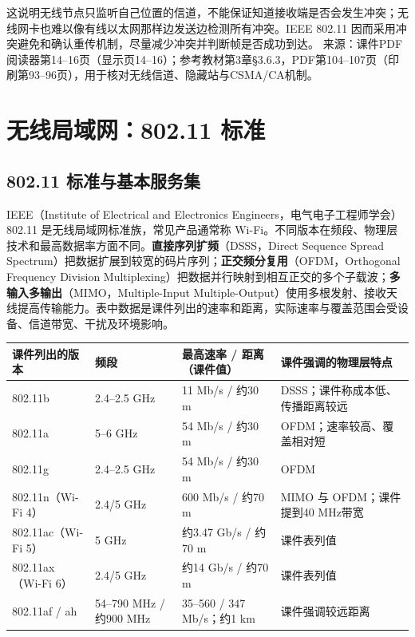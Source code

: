 这说明无线节点只监听自己位置的信道，不能保证知道接收端是否会发生冲突；无线网卡也难以像有线以太网那样边发送边检测所有冲突。IEEE 802.11 因而采用冲突避免和确认重传机制，尽量减少冲突并判断帧是否成功到达。
\annotationarea[4]
\small 来源：课件PDF阅读器第14--16页（显示页14--16）；参考教材第3章§3.6.3，PDF第104--107页（印刷第93--96页），用于核对无线信道、隐藏站与CSMA/CA机制。\normalsize

\section{无线局域网：802.11 标准}
\subsection{802.11 标准与基本服务集}
IEEE（Institute of Electrical and Electronics Engineers，电气电子工程师学会）802.11 是无线局域网标准族，常见产品通常称 Wi-Fi。不同版本在频段、物理层技术和最高数据率方面不同。\textbf{直接序列扩频}（DSSS，Direct Sequence Spread Spectrum）把数据扩展到较宽的码片序列；\textbf{正交频分复用}（OFDM，Orthogonal Frequency Division Multiplexing）把数据并行映射到相互正交的多个子载波；\textbf{多输入多输出}（MIMO，Multiple-Input Multiple-Output）使用多根发射、接收天线提高传输能力。表中数据是课件列出的速率和距离，实际速率与覆盖范围会受设备、信道带宽、干扰及环境影响。

\begin{center}\small
\begin{tabularx}{.98\textwidth}{l l l X}\toprule
课件列出的版本 & 频段 & 最高速率 / 距离（课件值） & 课件强调的物理层特点 \\\midrule
802.11b & 2.4--2.5 GHz & 11 Mb/s / 约30 m & DSSS；课件称成本低、传播距离较远 \\
802.11a & 5--6 GHz & 54 Mb/s / 约30 m & OFDM；速率较高、覆盖相对短 \\
802.11g & 2.4--2.5 GHz & 54 Mb/s / 约30 m & OFDM \\
802.11n（Wi-Fi 4） & 2.4/5 GHz & 600 Mb/s / 约70 m & MIMO 与 OFDM；课件提到40 MHz带宽 \\
802.11ac（Wi-Fi 5） & 5 GHz & 约3.47 Gb/s / 约70 m & 课件表列值 \\
802.11ax（Wi-Fi 6） & 2.4/5 GHz & 约14 Gb/s / 约70 m & 课件表列值 \\
802.11af / ah & 54--790 MHz / 约900 MHz & 35--560 / 347 Mb/s；约1 km & 课件强调较远距离 \\\bottomrule
\end{tabularx}\end{center}


